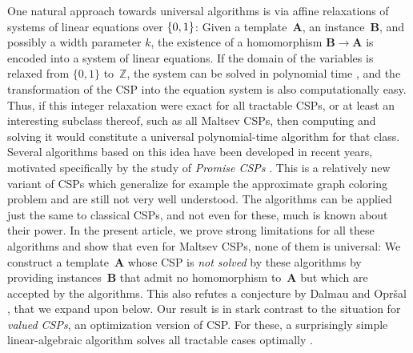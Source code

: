 \documentclass[a4paper,english, thm-restate]{lipics-v2021}
\DeclarePairedDelimiter\set{\lbrace}{\rbrace}
\newcommand{\StructA}{\mathbf{A}}
\newcommand{\StructB}{\mathbf{B}}
\newcommand{\bbZ}{\mathbb{Z}}
\begin{document}
	One natural approach towards universal algorithms is via affine relaxations 
	of systems of linear equations over $\set{0,1}$: Given a template~$\StructA$, an instance~$\StructB$, and possibly a width parameter $k$, the existence of a homomorphism $\StructB \to \StructA$ is encoded
	into a system of linear equations. If the domain of the variables is relaxed from $\{0,1\}$ to~$\bbZ$, the system can be solved in polynomial time \cite{BachemRavindran, Schrijver1986}, and the transformation of the CSP into the equation system is also computationally easy. 
	Thus, if this integer relaxation were exact for all tractable CSPs, or at least an interesting subclass thereof, such as all Maltsev CSPs, then computing and solving it would constitute a universal polynomial-time algorithm for that class.
	Several algorithms based on this idea have been developed in recent years, motivated specifically by the study of \emph{Promise CSPs} \cite{BrakensiekGWZ2020, BrakensiekGuruswami19, CiardoZivny2023CLAP, DalmauOprsal2024}. This is a relatively new variant of CSPs which generalize for example the approximate graph coloring problem and are still not very well understood. 
	The algorithms can be applied just the same to classical CSPs, and not even for these, much is known about their power. 
	In the present article, we prove strong limitations for all these algorithms and show that even for Maltsev CSPs, none of them is universal: We construct a template~$\StructA$ whose CSP is \emph{not solved} by these algorithms by providing instances~$\StructB$ that admit no homomorphism to~$\StructA$
	but which are accepted by the algorithms. 
	This also refutes a conjecture by Dalmau and Opr\v{s}al \cite{DalmauOprsal2024}, that we expand upon below.
	Our result is in stark contrast to the situation for \emph{valued CSPs}, an optimization version of CSP. For these, a surprisingly simple linear-algebraic algorithm solves all tractable cases optimally \cite{ThapperZivny}.
	
\end{document}
